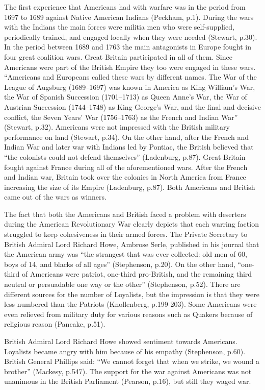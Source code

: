 The first experience that Americans had with warfare was in the period from 1697
to 1689 against Native American Indians (Peckham, p.1).  During the wars with
the Indians the main forces were militia men who were self-supplied,
periodically trained, and engaged locally when they were needed (Stewart, p.30).
In the period between 1689 and 1763 the main antagonists in Europe fought in
four great coalition wars.  Great Britain participated in all of them. Since
Americans were part of the British Empire they too were engaged in these wars.
“Americans and Europeans called these wars by different names.  The War of the
League of Augsburg (1689–1697) was known in America as King William’s War, the
War of Spanish Succession (1701–1713) as Queen Anne’s War, the War of Austrian
Succession (1744–1748) as King George’s War, and the final and decisive
conflict, the Seven Years’ War (1756–1763) as the French and Indian War”
(Stewart, p.32).  Americans were not impressed with the British military
performance on land (Stewart, p.34).  On the other hand, after the French and
Indian War and later war with Indians led by Pontiac, the British believed that
“the colonists could not defend themselves” (Ladenburg, p.87).  Great Britain
fought against France during all of the aforementioned wars.  After the French
and Indian war, Britain took over the colonies in North America from France
increasing the size of its Empire (Ladenburg, p.87).  Both Americans and British
came out of the wars as winners.

The fact that both the Americans and British faced a problem with deserters
during the American Revolutionary War clearly depicts that each warring faction
struggled to keep cohesiveness in their armed forces.  The Private Secretary to
British Admiral Lord Richard Howe, Ambrose Serle, published in his journal that
the American army was “the strangest that was ever collected: old men of 60,
boys of 14, and blacks of all ages” (Stephenson, p.20).  On the other hand,
“one-third of Americans were patriot, one-third pro-British, and the remaining
third neutral or persuadable one way or the other” (Stephenson, p.52).  There
are different sources for the number of Loyalists, but the impression is that
they were less numbered than the Patriots (Knollenberg, p.199-203).  Some
Americans were even relieved from military duty for various reasons such as
Quakers because of religious reason (Pancake, p.51).

British Admiral Lord Richard Howe showed sentiment towards Americans. Loyalists
became angry with him because of his empathy (Stephenson, p.60).  British
General Phillips said: “We cannot forget that when we strike, we wound a
brother” (Mackesy, p.547).  The support for the war against Americans was not
unanimous in the British Parliament (Pearson, p.16), but still they waged war.

